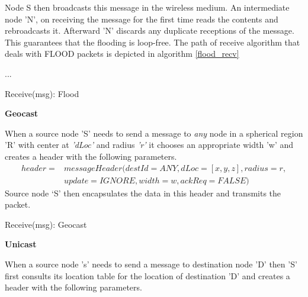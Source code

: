 Node S then broadcasts this message in the wireless medium. An intermediate node 'N', on receiving the message for the first time reads the contents and rebroadcasts it. Afterward 'N' discards any duplicate receptions of the message. This guarantees that the flooding is loop-free.
The path of receive algorithm that deals with FLOOD packets is depicted in algorithm \ref{flood_recv}

\begin{algorithm}
\SetAlgoLined
\DontPrintSemicolon
{}
 { 
}{
    ...
}
\caption{Receive(msg): Flood} \label{flood_recv}
\end{algorithm}

\textbf{Geocast}


When a source node 'S' needs to send a message to \emph{any} node in a spherical region 'R' with center at \emph{'dLoc'} and radius \emph{'r'} it chooses an appropriate width 'w' and creates a header with the following parameters.
\begin{eqnarray*}
header = & messageHeader(destId = ANY, dLoc = [x,y,z], radius = r,\\
    & update = IGNORE, width = w, ackReq = FALSE)
\end{eqnarray*}
Source node `S' then encapsulates the data in this header and transmits the packet.

\begin{algorithm}
\SetAlgoLined
\DontPrintSemicolon
{}


\caption{Receive(msg): Geocast} \label{geocast_recv}
\end{algorithm}

\textbf{Unicast}

When a source node 's' needs to send a message to destination node 'D' then 'S' first consults its location table for the location of destination 'D' and creates a header with the following parameters.

